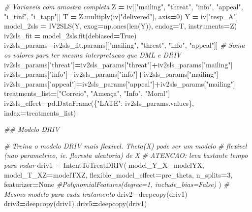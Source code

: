 \documentclass[
]{article}
\newenvironment{Shaded}{\begin{snugshade}}{\end{snugshade}}
\newcommand{\BuiltInTok}[1]{#1}
\newcommand{\CommentTok}[1]{\textcolor[rgb]{0.56,0.35,0.01}{\textit{#1}}}
\newcommand{\DecValTok}[1]{\textcolor[rgb]{0.00,0.00,0.81}{#1}}
\newcommand{\NormalTok}[1]{#1}
\newcommand{\OperatorTok}[1]{\textcolor[rgb]{0.81,0.36,0.00}{\textbf{#1}}}
\newcommand{\StringTok}[1]{\textcolor[rgb]{0.31,0.60,0.02}{#1}}
\newcommand{\VariableTok}[1]{\textcolor[rgb]{0.00,0.00,0.00}{#1}}
\begin{document}
\begin{Shaded}
\begin{Highlighting}[]
{{\CommentTok{# Variaveis com amostra completa}
\NormalTok{Z }\OperatorTok{=}\NormalTok{ iv[[}\StringTok{"mailing"}\NormalTok{, }\StringTok{"threat"}\NormalTok{, }\StringTok{"info"}\NormalTok{, }\StringTok{"appeal"}\NormalTok{, }\StringTok{"i_tinf"}\NormalTok{, }\StringTok{"i_tapp"}\NormalTok{]]}
\NormalTok{T }\OperatorTok{=}\NormalTok{ Z.multiply(iv[}\StringTok{"delivered"}\NormalTok{], axis}\OperatorTok{=}\DecValTok{0}\NormalTok{)}
\NormalTok{Y }\OperatorTok{=}\NormalTok{ iv[}\StringTok{"resp_A"}\NormalTok{]}
\NormalTok{model_2sls }\OperatorTok{=}\NormalTok{ IV2SLS(Y, exog}\OperatorTok{=}\NormalTok{np.ones(}\BuiltInTok{len}\NormalTok{(Y)), endog}\OperatorTok{=}\NormalTok{T, instruments}\OperatorTok{=}\NormalTok{Z)}
\NormalTok{iv2sls_fit }\OperatorTok{=}\NormalTok{ model_2sls.fit(debiased}\OperatorTok{=}\VariableTok{True}\NormalTok{)}
\NormalTok{iv2sls_params}\OperatorTok{=}\NormalTok{iv2sls_fit.params[[}\StringTok{"mailing"}\NormalTok{, }\StringTok{"threat"}\NormalTok{, }\StringTok{"info"}\NormalTok{, }\StringTok{"appeal"}\NormalTok{]]}
\CommentTok{# Soma os valores para ter mesma interpretacao que DML e DRIV}
\NormalTok{iv2sls_params[}\StringTok{"threat"}\NormalTok{]}\OperatorTok{=}\NormalTok{iv2sls_params[}\StringTok{"threat"}\NormalTok{]}\OperatorTok{+}\NormalTok{iv2sls_params[}\StringTok{"mailing"}\NormalTok{]}
\NormalTok{iv2sls_params[}\StringTok{"info"}\NormalTok{]}\OperatorTok{=}\NormalTok{iv2sls_params[}\StringTok{"info"}\NormalTok{]}\OperatorTok{+}\NormalTok{iv2sls_params[}\StringTok{"mailing"}\NormalTok{]}
\NormalTok{iv2sls_params[}\StringTok{"appeal"}\NormalTok{]}\OperatorTok{=}\NormalTok{iv2sls_params[}\StringTok{"appeal"}\NormalTok{]}\OperatorTok{+}\NormalTok{iv2sls_params[}\StringTok{"mailing"}\NormalTok{]}
\NormalTok{treatments_list}\OperatorTok{=}\NormalTok{[}\StringTok{"Correio"}\NormalTok{, }\StringTok{"Ameaça"}\NormalTok{, }\StringTok{"Info"}\NormalTok{, }\StringTok{"Moral"}\NormalTok{]}
\NormalTok{iv2sls_effect}\OperatorTok{=}\NormalTok{pd.DataFrame(\{}\StringTok{"LATE"}\NormalTok{: iv2sls_params.values\}, index}\OperatorTok{=}\NormalTok{treatments_list)}

\CommentTok{## Modelo DRIV}

\CommentTok{# Treina o modelo DRIV mais flexivel. Theta(X) pode ser um modelo}
\CommentTok{# flexivel (nao parametrico, ie. floresta aleatoria) de X}
\CommentTok{# ATENCAO: leva bastante tempo para rodar}
\NormalTok{driv1 }\OperatorTok{=}\NormalTok{ IntentToTreatDRIV(}
\NormalTok{    model_Y_X}\OperatorTok{=}\NormalTok{modelYX,}
\NormalTok{    model_T_XZ}\OperatorTok{=}\NormalTok{modelTXZ,}
\NormalTok{    flexible_model_effect}\OperatorTok{=}\NormalTok{pre_theta,}
\NormalTok{    n_splits}\OperatorTok{=}\DecValTok{3}\NormalTok{,}
\NormalTok{    featurizer}\OperatorTok{=}\VariableTok{None} \CommentTok{#PolynomialFeatures(degree=1, include_bias=False)}
\NormalTok{)}
\CommentTok{# Mesmo modelo para cada tratamento}
\NormalTok{driv2}\OperatorTok{=}\NormalTok{deepcopy(driv1)}
\NormalTok{driv3}\OperatorTok{=}\NormalTok{deepcopy(driv1)}
\NormalTok{driv5}\OperatorTok{=}\NormalTok{deepcopy(driv1)}

}}
\end{Highlighting}
\end{Shaded}
\end{document}
